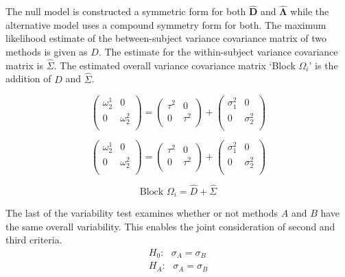 \documentclass[12pt, a4paper]{report}
\theoremstyle{plain}
\theoremstyle{definition}
\theoremstyle{remark}
\begin{document}
	The null model is constructed a symmetric form for both $\boldsymbol{\hat{D}}$ and $\boldsymbol{\hat{\Lambda}}$ while the alternative model uses a compound symmetry form for both.
The maximum likelihood estimate of the between-subject variance
covariance matrix of two methods is given as $D$. The estimate for
the within-subject variance covariance matrix is $\hat{\Sigma}$.
The estimated overall variance covariance matrix `Block
$\Omega_{i}$' is the addition of $\hat{D}$ and $\hat{\Sigma}$.

\[\left(\begin{array}{cc}
\omega^1_2  & 0 \\
0 & \omega^2_2 \\
\end{array}  \right)
=  \left(
\begin{array}{cc}
\tau^2  & 0 \\
0 & \tau^2 \\
\end{array} \right)+
\left(
\begin{array}{cc}
\sigma^2_1  & 0 \\
0 & \sigma^2_2 \\
\end{array}\right)
\]

\[\left(\begin{array}{cc}
\omega^1_2  & 0 \\
0 & \omega^2_2 \\
\end{array}  \right)
=  \left(
\begin{array}{cc}
\tau^2  & 0 \\
0 & \tau^2 \\
\end{array} \right)+
\left(
\begin{array}{cc}
\sigma^2_1  & 0 \\
0 & \sigma^2_2 \\
\end{array}\right)
\]


\newpage


\begin{equation}
\mbox{Block  }\Omega_{i} = \hat{D} + \hat{\Sigma}
\end{equation}

	The last of the variability test examines whether or not methods $A$ and $B$ have the same overall variability. This enables the joint consideration of second and third criteria.
	\begin{eqnarray*}
		H_{0}: \mbox{ }\sigma_{A}  = \sigma_{B} \\
		H_{A}: \mbox{ }\sigma_{A}  = \sigma_{B}
	\end{eqnarray*}
	
\end{document}
